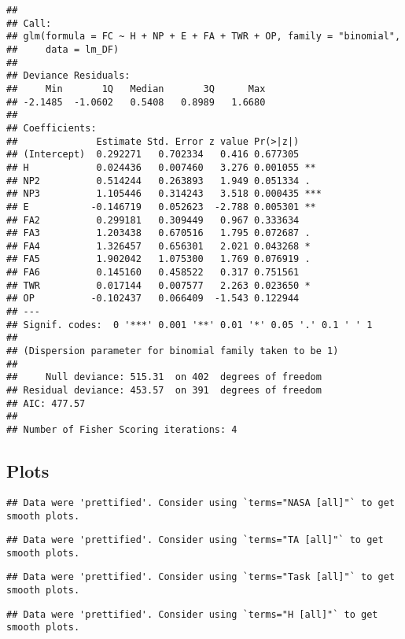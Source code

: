 \documentclass[]{article}
\begin{document}
\begin{verbatim}
## 
## Call:
## glm(formula = FC ~ H + NP + E + FA + TWR + OP, family = "binomial", 
##     data = lm_DF)
## 
## Deviance Residuals: 
##     Min       1Q   Median       3Q      Max  
## -2.1485  -1.0602   0.5408   0.8989   1.6680  
## 
## Coefficients:
##              Estimate Std. Error z value Pr(>|z|)    
## (Intercept)  0.292271   0.702334   0.416 0.677305    
## H            0.024436   0.007460   3.276 0.001055 ** 
## NP2          0.514244   0.263893   1.949 0.051334 .  
## NP3          1.105446   0.314243   3.518 0.000435 ***
## E           -0.146719   0.052623  -2.788 0.005301 ** 
## FA2          0.299181   0.309449   0.967 0.333634    
## FA3          1.203438   0.670516   1.795 0.072687 .  
## FA4          1.326457   0.656301   2.021 0.043268 *  
## FA5          1.902042   1.075300   1.769 0.076919 .  
## FA6          0.145160   0.458522   0.317 0.751561    
## TWR          0.017144   0.007577   2.263 0.023650 *  
## OP          -0.102437   0.066409  -1.543 0.122944    
## ---
## Signif. codes:  0 '***' 0.001 '**' 0.01 '*' 0.05 '.' 0.1 ' ' 1
## 
## (Dispersion parameter for binomial family taken to be 1)
## 
##     Null deviance: 515.31  on 402  degrees of freedom
## Residual deviance: 453.57  on 391  degrees of freedom
## AIC: 477.57
## 
## Number of Fisher Scoring iterations: 4
\end{verbatim}

\hypertarget{plots-2}{%
\subsection{Plots}\label{plots-2}}

\begin{verbatim}
## Data were 'prettified'. Consider using `terms="NASA [all]"` to get smooth plots.
\end{verbatim}

\begin{verbatim}
## Data were 'prettified'. Consider using `terms="TA [all]"` to get smooth plots.
\end{verbatim}

\begin{verbatim}
## Data were 'prettified'. Consider using `terms="Task [all]"` to get smooth plots.
\end{verbatim}

\begin{verbatim}
## Data were 'prettified'. Consider using `terms="H [all]"` to get smooth plots.
\end{verbatim}
\end{document}
